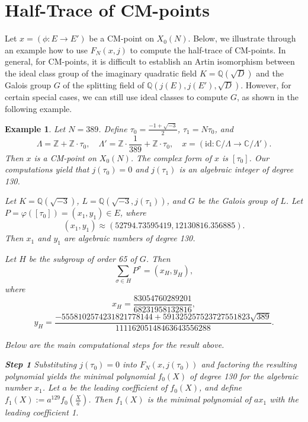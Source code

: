 \documentclass[10pt, a4paper]{article}
\newtheorem{example}[theorem]{Example}
\begin{document}
\section{Half-Trace of  CM-points}

Let \( x = (\phi : E \rightarrow E') \) be a CM-point on \( X_0(N) \).  Below, we illustrate through an example how to use \( F_N(x, j) \) to compute the half-trace of CM-points. In general, for CM-points, it is difficult  to establish an Artin isomorphism between the ideal class group of the imaginary quadratic field \( K = \mathbb{Q}(\sqrt{D}) \) and the Galois group \( G \) of the splitting field  of  \( \mathbb{Q}(j(E), j(E'), \sqrt{D}) \).  However, for certain special cases, we can still use ideal classes to compute \( G \), as shown in the following example.

\begin{example}
Let \( N = 389 \). Define \( \tau_0 = \frac{-1 + \sqrt{-3}}{2} \), \( \tau_1 = N \tau_0 \), and
\[
\Lambda = \mathbb{Z} + \mathbb{Z} \cdot \tau_0, \quad \Lambda' = \mathbb{Z} \cdot \frac{1}{389} + \mathbb{Z} \cdot \tau_0, \quad x = (\text{id} : \mathbb{C} / \Lambda \rightarrow \mathbb{C} / \Lambda').
\]
Then \( x \) is a CM-point on \( X_0(N) \). The complex form of \( x \) is \( [\tau_0] \). Our computations yield  that \( j(\tau_0) = 0 \)  and  \( j(\tau_1) \) is an algebraic integer of degree 130.

Let \( K = \mathbb{Q}(\sqrt{-3}) \), \( L = \mathbb{Q}(\sqrt{-3}, j(\tau_1)) \), and \( G \) be the Galois group of \( L \).
Let \( P = \varphi([\tau_0]) = (x_1, y_1) \in E \), where
\[
(x_1, y_1) \approx (52794.73595419, 12130816.356885).
\]
Then \( x_1 \) and \( y_1 \) are algebraic numbers of degree 130.

Let \( H \) be the subgroup of order 65 of \( G \). Then
\[
\sum_{\sigma \in H} P^\sigma = (x_H, y_H),
\]
where
\[
x_H = \frac{83054760289201}{68231958132816},
\]
\[
y_H = \frac{-5558102574231821778144 + 591325257523727551823\sqrt{389}}{11116205148463643556288}.
\]

Below are the main computational steps for the result above.

{\bf Step 1}
Substituting  \( j(\tau_0) = 0 \) into \( F_N(x, j(\tau_0)) \)  and factoring
the resulting polynomial yields  the minimal polynomial \( f_0(X) \) of degree 130
for the algebraic number  \( x_1 \).
Let \( a \) be the leading coefficient of \( f_0(X) \), and define \( f_1(X) := a^{129} f_0\left(\frac{X}{a}\right) \). Then \( f_1(X) \) is the minimal polynomial of \( a x_1 \) with the leading coefficient 1.


\end{example}
\end{document}
